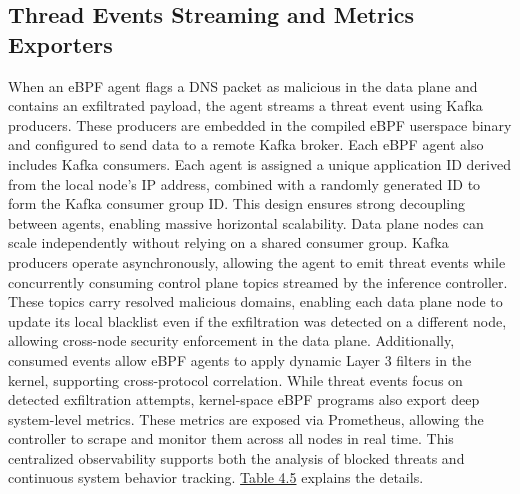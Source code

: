 \documentclass [11pt, proquest] {uwthesis}[2020/02/24]
\begin{document}
\subsection{Thread Events Streaming and Metrics Exporters}
\label{sec:threat-event-streaming}
When an eBPF agent flags a DNS packet as malicious in the data plane and contains an exfiltrated payload, the agent streams a threat event using Kafka producers. These producers are embedded in the compiled eBPF userspace binary and configured to send data to a remote Kafka broker. Each eBPF agent also includes Kafka consumers. Each agent is assigned a unique application ID derived from the local node’s IP address, combined with a randomly generated ID to form the Kafka consumer group ID. This design ensures strong decoupling between agents, enabling massive horizontal scalability. Data plane nodes can scale independently without relying on a shared consumer group. Kafka producers operate asynchronously, allowing the agent to emit threat events while concurrently consuming control plane topics streamed by the inference controller. These topics carry resolved malicious domains, enabling each data plane node to update its local blacklist even if the exfiltration was detected on a different node, allowing cross-node security enforcement in the data plane. Additionally, consumed events allow eBPF agents to apply dynamic Layer 3 filters in the kernel, supporting cross-protocol correlation. While threat events focus on detected exfiltration attempts, kernel-space eBPF programs also export deep system-level metrics. These metrics are exposed via Prometheus, allowing the controller to scrape and monitor them across all nodes in real time. This centralized observability supports both the analysis of blocked threats and continuous system behavior tracking. \hyperref[tab:kafka-topics]{Table 4.5} explains the details.
\end{document}
